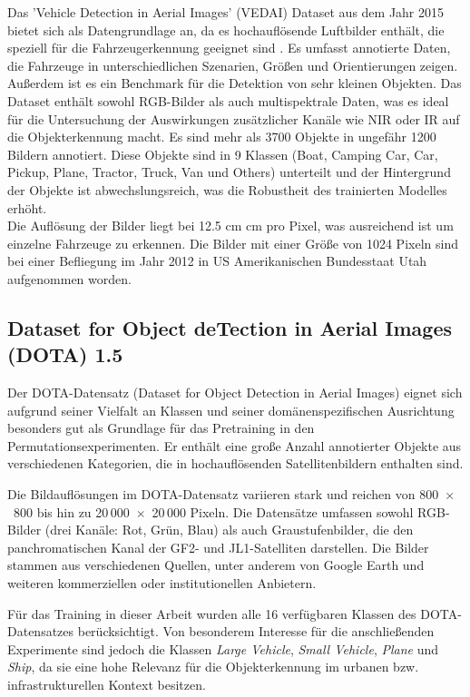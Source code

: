 Das 'Vehicle Detection in Aerial Images' (VEDAI) Dataset \cite{vedai_web}  aus dem Jahr 2015 bietet sich als Datengrundlage an, da es hochauflösende Luftbilder enthält, die speziell für die Fahrzeugerkennung geeignet sind \cite{Razakarivony2015}. Es umfasst annotierte Daten, die Fahrzeuge in unterschiedlichen Szenarien, Größen und Orientierungen zeigen. Außerdem ist es ein Benchmark für die Detektion von sehr kleinen Objekten. Das Dataset enthält sowohl RGB-Bilder als auch multispektrale Daten, was es ideal für die Untersuchung der Auswirkungen zusätzlicher Kanäle wie NIR oder IR auf die Objekterkennung macht. Es sind mehr als 3700 Objekte in ungefähr 1200 Bildern annotiert. Diese Objekte sind in 9 Klassen (Boat, Camping Car, Car, Pickup, Plane, Tractor, Truck, Van und Others) unterteilt und der Hintergrund der Objekte ist abwechslungsreich, was die Robustheit des trainierten Modelles erhöht. \\
Die Auflösung der Bilder liegt bei 12.5 cm  cm pro Pixel, was ausreichend ist um einzelne Fahrzeuge zu erkennen. Die Bilder mit einer Größe von 1024  Pixeln sind bei einer Befliegung im Jahr 2012 in US Amerikanischen Bundesstaat Utah aufgenommen worden. 



\subsection{Dataset for Object deTection in Aerial Images (DOTA) 1.5}

Der DOTA-Datensatz (Dataset for Object Detection in Aerial Images) eignet sich aufgrund seiner Vielfalt an Klassen und seiner domänenspezifischen Ausrichtung besonders gut als Grundlage für das Pretraining in den Permutationsexperimenten. Er enthält eine große Anzahl annotierter Objekte aus verschiedenen Kategorien, die in hochauflösenden Satellitenbildern enthalten sind.

Die Bildauflösungen im DOTA-Datensatz variieren stark und reichen von 800~$\times$~800 bis hin zu 20\,000~$\times$~20\,000 Pixeln. Die Datensätze umfassen sowohl RGB-Bilder (drei Kanäle: Rot, Grün, Blau) als auch Graustufenbilder, die den panchromatischen Kanal der GF2- und JL1-Satelliten darstellen. Die Bilder stammen aus verschiedenen Quellen, unter anderem von Google Earth und weiteren kommerziellen oder institutionellen Anbietern.

Für das Training in dieser Arbeit wurden alle 16 verfügbaren Klassen des DOTA-Datensatzes berücksichtigt. Von besonderem Interesse für die anschließenden Experimente sind jedoch die Klassen \textit{Large Vehicle}, \textit{Small Vehicle}, \textit{Plane} und \textit{Ship}, da sie eine hohe Relevanz für die Objekterkennung im urbanen bzw. infrastrukturellen Kontext besitzen.

